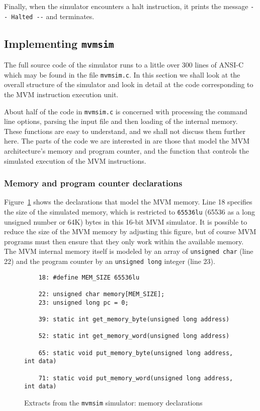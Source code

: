 Finally, when the simulator encounters a {\sc halt} instruction, it
prints the message \verb+-- Halted --+ and  terminates.

\subsection{Implementing {\tt mvmsim}}

The full source code of the simulator runs to a little over 300 lines of
ANSI-C which may be found in the file {\tt mvmsim.c}. In this section we
shall look at the overall structure of the simulator and look in detail
at the code corresponding to the MVM instruction execution unit.

About half of the code in {\tt mvmsim.c} is concerned with processing
the command line options, parsing the input file and then loading of the
internal memory. These functions are easy to understand, and we shall not discuss
them further here. The parts of the code we are interested in are those that
model the MVM architecture's memory and program counter, and the function that
controls the simulated execution of the MVM instructions.

\subsubsection{Memory and program counter declarations}

Figure~\ref{mvmsim1} shows the declarations that model the MVM memory.
Line 18 specifies the size of the simulated memory, which is restricted
to {\tt 65536lu} (65536 as a long unsigned number or 64K) bytes in this
16-bit MVM simulator. It is possible to reduce the size of the MVM
memory by adjusting this figure, but of course MVM programs must then
ensure that they only work within the available memory. The MVM internal
memory itself is modeled by an array of {\tt unsigned char} (line 22)
and the program counter by an {\tt unsigned long} integer (line 23).
\begin{figure}
\hspace*{0cm}
\begin{minipage}{30cm}
\small
\begin{verbatim}
    18: #define MEM_SIZE 65536lu

    22: unsigned char memory[MEM_SIZE];
    23: unsigned long pc = 0;

    39: static int get_memory_byte(unsigned long address)

    52: static int get_memory_word(unsigned long address)

    65: static void put_memory_byte(unsigned long address, int data)

    71: static void put_memory_word(unsigned long address, int data)
\end{verbatim}
\end{minipage}
\caption{Extracts from the {\tt mvmsim} simulator: memory declarations}
\label{mvmsim1}
\end{figure}

